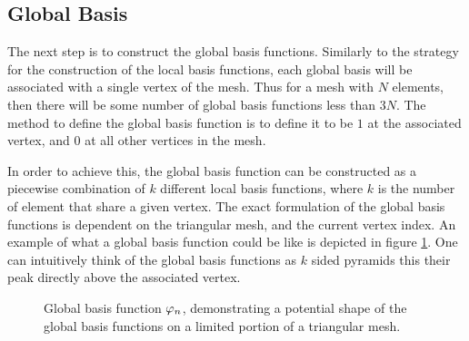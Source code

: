 \documentclass[../fem.tex]{subfile}
\begin{document}
\subsection{Global Basis}%
\label{sub:global_basis}

The next step is to construct the global basis functions. Similarly to the
strategy for the construction of the local basis functions, each global basis
will be associated with a single vertex of the mesh. Thus for a mesh with $N$
elements, then there will be some number of global basis functions less than
$3N$. The method to define the global basis function is to define it to be $1$
at the associated vertex, and $0$ at all other vertices in the mesh.

In order to achieve this, the global basis function can be constructed as a
piecewise combination of $k$ different local basis functions, where $k$ is the
number of element that share a given vertex. The exact formulation of the
global basis functions is dependent on the triangular mesh, and the current
vertex index. An example of what a global basis function could be like is
depicted in figure \ref{fig:global_basis}. One can intuitively think of the
global basis functions as $k$ sided pyramids this their peak directly above the
associated vertex.

\begin{figure}[htpb]
\begin{center}
\end{center}
\caption{Global basis function $\varphi_n$, demonstrating a potential shape of the
global basis functions on a limited portion of a triangular mesh.}
\label{fig:global_basis}
\end{figure}
\end{document}
